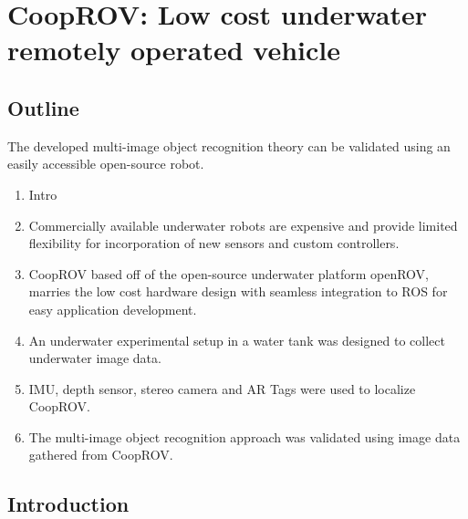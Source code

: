 \documentclass {udthesis}
\begin{document}

\chapter{CoopROV: Low cost underwater remotely operated vehicle}


\section{Outline}

The developed multi-image object recognition theory can be validated using an easily accessible 
open-source robot.

\begin{enumerate}[label=Section \arabic*:, start=0]
\item Intro

\item Commercially available underwater robots are expensive and provide limited flexibility for incorporation of new sensors and custom controllers.

\item CoopROV based off of the open-source underwater platform openROV, marries the low cost hardware design with seamless integration to ROS for easy application development.

\item An underwater experimental setup in a water tank was designed to collect underwater image data.

\item IMU, depth sensor, stereo camera and AR Tags were used to localize CoopROV.

\item The multi-image object recognition approach was validated using image data gathered from CoopROV.

\end{enumerate}


\section{Introduction}
\end{document}
